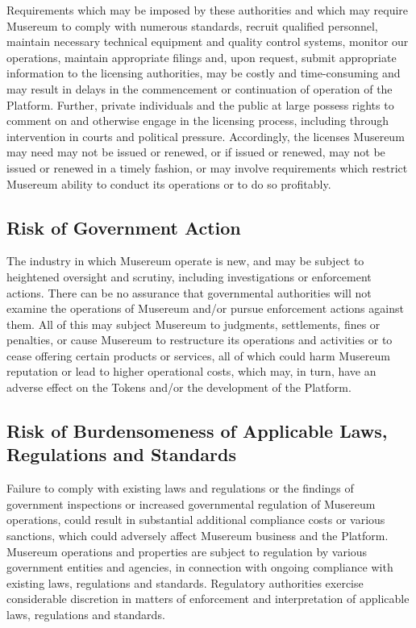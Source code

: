 \documentclass[12pt]{report}
\begin{document}
Requirements which may be imposed by these authorities and which may require Musereum to comply with numerous standards, recruit qualified personnel, maintain necessary technical equipment and quality control systems, monitor our operations, maintain appropriate filings and, upon request, submit appropriate information to the licensing authorities, may be costly and time-consuming and may result in delays in the commencement or continuation of operation of the Platform. Further, private individuals and the public at large possess rights to comment on and otherwise engage in the licensing process, including through intervention in courts and political pressure. Accordingly, the licenses Musereum may need may not be issued or renewed, or if issued or renewed, may not be issued or renewed in a timely fashion, or may involve requirements which restrict Musereum ability to conduct its operations or to do so profitably.


\subsection*{Risk of Government Action}
The industry in which Musereum operate is new, and may be subject to heightened oversight and scrutiny, including investigations or enforcement actions. There can be no assurance that governmental authorities will not examine the operations of Musereum and/or pursue enforcement actions against them. All of this may subject Musereum to judgments, settlements, fines or penalties, or cause Musereum to restructure its operations and activities or to cease offering certain products or services, all of which could harm Musereum reputation or lead to higher operational costs, which may, in turn, have an adverse effect on the Tokens and/or the development of the Platform.

\subsection*{Risk of Burdensomeness of Applicable Laws, Regulations and Standards}
Failure to comply with existing laws and regulations or the findings of government inspections or increased governmental regulation of Musereum operations, could result in substantial additional compliance costs or various sanctions, which could adversely affect Musereum business and the Platform. Musereum operations and properties are subject to regulation by various government entities and agencies, in connection with ongoing compliance with existing laws, regulations and standards. Regulatory authorities exercise considerable discretion in matters of enforcement and interpretation of applicable laws, regulations and standards.
\end{document}
